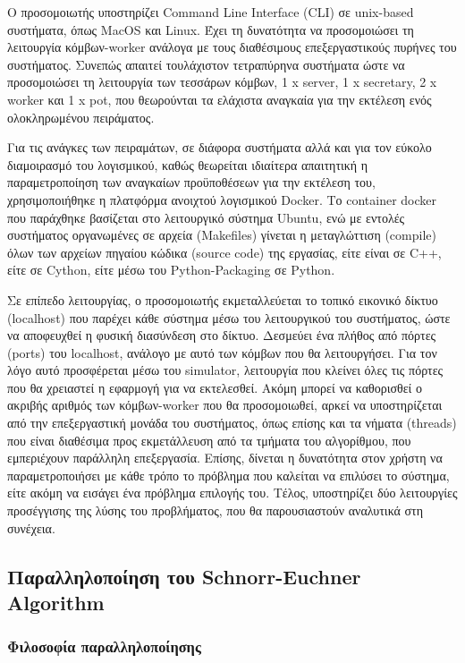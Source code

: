 Ο προσομοιωτής υποστηρίζει Command Line Interface (CLI) σε unix-based συστήματα, όπως MacOS και Linux. Έχει τη δυνατότητα να προσομοιώσει τη λειτουργία κόμβων-worker ανάλογα με τους διαθέσιμους επεξεργαστικούς πυρήνες του συστήματος. Συνεπώς απαιτεί τουλάχιστον τετραπύρηνα συστήματα ώστε να προσομοιώσει τη λειτουργία των τεσσάρων κόμβων, 1 x server, 1 x secretary, 2 x worker και 1 x pot, που θεωρούνται τα ελάχιστα αναγκαία για την εκτέλεση ενός ολοκληρωμένου πειράματος. 

Για τις ανάγκες των πειραμάτων, σε διάφορα συστήματα αλλά και για τον εύκολο διαμοιρασμό του λογισμικού, καθώς θεωρείται ιδιαίτερα απαιτητική η παραμετροποίηση των αναγκαίων προϋποθέσεων για την εκτέλεση του, χρησιμοποιήθηκε η πλατφόρμα ανοιχτού λογισμικού Docker\cite{DockerInPractise}\cite{DockerDeepDive}. Το container docker που παράχθηκε βασίζεται στο λειτουργικό σύστημα Ubuntu, ενώ με εντολές συστήματος οργανωμένες σε αρχεία (Makefiles) γίνεται η μεταγλώττιση (compile) όλων των αρχείων πηγαίου κώδικα (source code) της εργασίας, είτε είναι σε C++, είτε σε Cython, είτε μέσω του Python-Packaging\cite{PythonPackaging} σε Python. 

Σε επίπεδο λειτουργίας, ο προσομοιωτής εκμεταλλεύεται το τοπικό εικονικό δίκτυο (localhost) που παρέχει κάθε σύστημα μέσω του λειτουργικού του συστήματος, ώστε να αποφευχθεί η φυσική διασύνδεση στο δίκτυο. Δεσμεύει ένα πλήθος από πόρτες (ports) του localhost, ανάλογο με αυτό των κόμβων που θα λειτουργήσει. Για τον λόγο αυτό προσφέρεται μέσω του simulator, λειτουργία που κλείνει όλες τις πόρτες που θα χρειαστεί η εφαρμογή για να εκτελεσθεί. Ακόμη μπορεί να καθορισθεί ο ακριβής αριθμός των κόμβων-worker που θα προσομοιωθεί, αρκεί να υποστηρίζεται από την επεξεργαστική μονάδα του συστήματος, όπως επίσης και τα νήματα (threads) που είναι διαθέσιμα προς εκμετάλλευση από τα τμήματα του αλγορίθμου, που εμπεριέχουν παράλληλη επεξεργασία. Επίσης, δίνεται η δυνατότητα στον χρήστη να παραμετροποιήσει με κάθε τρόπο το πρόβλημα που καλείται να επιλύσει το σύστημα, είτε ακόμη να εισάγει ένα πρόβλημα επιλογής του. Τέλος, υποστηρίζει δύο λειτουργίες προσέγγισης της λύσης του προβλήματος, που θα παρουσιαστούν αναλυτικά στη συνέχεια. 
 
\subsection{Παραλληλοποίηση του \lt Schnorr-Euchner Algorithm}

\subsubsection{Φιλοσοφία παραλληλοποίησης}

